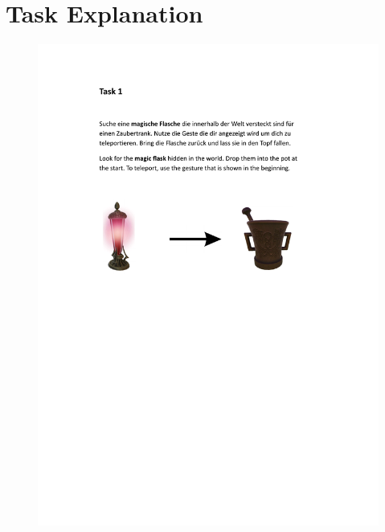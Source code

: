 \section{Task Explanation}
\begin{figure}[!h]
\centering
\includegraphics[page=1,width=\textwidth]{figures/Appendix/task explaination.pdf}
\end{figure}
